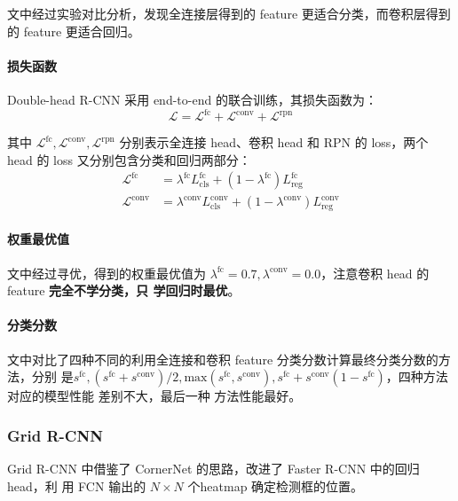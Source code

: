 文中经过实验对比分析，发现全连接层得到的 feature 更适合分类，而卷积层得到
的 feature 更适合回归。

\paragraph{损失函数}
Double-head R-CNN 采用 end-to-end 的联合训练，其损失函数为：
\begin{equation}
  \label{equ:double-head-loss}
  \mathcal{L} = \mathcal{L}^{\mathrm{fc}} + \mathcal{L}^{\mathrm{conv}} + \mathcal{L}^{\mathrm{rpn}}
\end{equation}

其中 $\mathcal{L}^{\mathrm{fc}}, \mathcal{L}^{\mathrm{conv}},
\mathcal{L}^{\mathrm{rpn}}$ 分别表示全连接 head、卷积 head 和 RPN 的 loss，两个
head 的 loss 又分别包含分类和回归两部分：
\begin{align}
  \label{equ:double-head-fc-loss}
  \mathcal{L}^{\mathrm{fc}} & = \lambda^{\mathrm{fc}}L_{\mathrm{cls}}^{\mathrm{fc}} + (1-\lambda^{\mathrm{fc}})L_{\mathrm{reg}}^{\mathrm{fc}} \\
  \label{equ:double-head-conv-loss}
  \mathcal{L}^{\mathrm{conv}} & = \lambda^{\mathrm{conv}}L_{\mathrm{cls}}^{\mathrm{conv}} + (1-\lambda^{\mathrm{conv}})L_{\mathrm{reg}}^{\mathrm{conv}}
\end{align}

\paragraph{权重最优值}
文中经过寻优，得到的权重最优值为 $\lambda^{\mathrm{fc}} = 0.7,
\lambda^{\mathrm{\mathrm{conv}}} = 0.0$，注意卷积 head 的 feature \textbf{完全不学分类，只
学回归时最优}。

\paragraph{分类分数}
文中对比了四种不同的利用全连接和卷积 feature 分类分数计算最终分类分数的方法，分别
是$s^{\mathrm{fc}}, (s^{\mathrm{fc}} + s^{\mathrm{conv}})/2,
\mathrm{max}(s^{\mathrm{fc}}, s^{\mathrm{conv}}), s^{\mathrm{fc}} +
s^{\mathrm{conv}}(1-s^{\mathrm{fc}})$，四种方法对应的模型性能 差别不大，最后一种
方法性能最好。

\subsubsection{Grid R-CNN}
Grid R-CNN 中借鉴了 CornerNet 的思路，改进了 Faster R-CNN 中的回归 head，利
用 FCN 输出的 $N \times N$ 个heatmap 确定检测框的位置。

